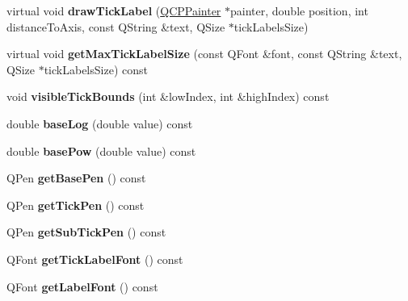 \begin{DoxyCompactItemize}
\item 
\hypertarget{classQCPAxis_a436ea8b8621fa3b897d3ca23b48d990a}{virtual void {\bfseries draw\-Tick\-Label} (\hyperlink{classQCPPainter}{Q\-C\-P\-Painter} $\ast$painter, double position, int distance\-To\-Axis, const Q\-String \&text, Q\-Size $\ast$tick\-Labels\-Size)}\label{classQCPAxis_a436ea8b8621fa3b897d3ca23b48d990a}

\item 
\hypertarget{classQCPAxis_aca8025b82a43a4627eb87db9026a69c0}{virtual void {\bfseries get\-Max\-Tick\-Label\-Size} (const Q\-Font \&font, const Q\-String \&text, Q\-Size $\ast$tick\-Labels\-Size) const }\label{classQCPAxis_aca8025b82a43a4627eb87db9026a69c0}

\item 
\hypertarget{classQCPAxis_a06320a944d1120732cc0d72fe1306d8b}{void {\bfseries visible\-Tick\-Bounds} (int \&low\-Index, int \&high\-Index) const }\label{classQCPAxis_a06320a944d1120732cc0d72fe1306d8b}

\item 
\hypertarget{classQCPAxis_a1385765db2419ee5fb5505a6cf9130fb}{double {\bfseries base\-Log} (double value) const }\label{classQCPAxis_a1385765db2419ee5fb5505a6cf9130fb}

\item 
\hypertarget{classQCPAxis_a97d69f021a05126fcb978d0aefea47b8}{double {\bfseries base\-Pow} (double value) const }\label{classQCPAxis_a97d69f021a05126fcb978d0aefea47b8}

\item 
\hypertarget{classQCPAxis_a3eb0681d31baf579bb73b86a0153cb02}{Q\-Pen {\bfseries get\-Base\-Pen} () const }\label{classQCPAxis_a3eb0681d31baf579bb73b86a0153cb02}

\item 
\hypertarget{classQCPAxis_a7f503910be40fb1717e1635be3ef17e1}{Q\-Pen {\bfseries get\-Tick\-Pen} () const }\label{classQCPAxis_a7f503910be40fb1717e1635be3ef17e1}

\item 
\hypertarget{classQCPAxis_ab4f7e60a40eb051c775afcaeab895c85}{Q\-Pen {\bfseries get\-Sub\-Tick\-Pen} () const }\label{classQCPAxis_ab4f7e60a40eb051c775afcaeab895c85}

\item 
\hypertarget{classQCPAxis_aef30b66668986523225089a67280ec7a}{Q\-Font {\bfseries get\-Tick\-Label\-Font} () const }\label{classQCPAxis_aef30b66668986523225089a67280ec7a}

\item 
\hypertarget{classQCPAxis_ab0768eb2879efb202645d19ff789e63e}{Q\-Font {\bfseries get\-Label\-Font} () const }\label{classQCPAxis_ab0768eb2879efb202645d19ff789e63e}


\end{DoxyCompactItemize}

